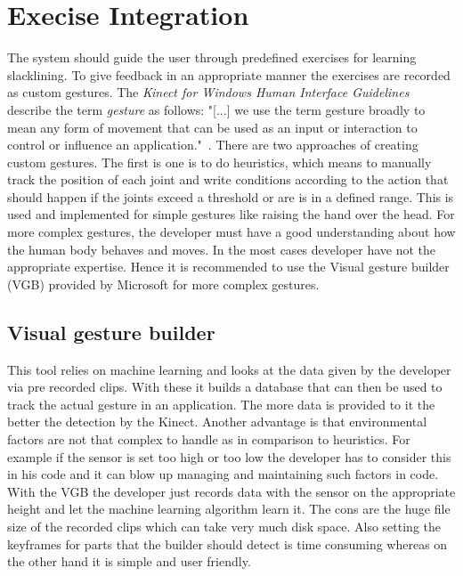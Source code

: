 \section{Execise Integration}\label{5_2_gestureConstruction}
The system should guide the user through predefined exercises for learning slacklining. To give feedback in an appropriate manner the exercises are recorded as custom gestures. The \textit{Kinect for Windows Human Interface Guidelines} describe the term \textit{gesture} as follows: "[...] we use the term gesture broadly to mean any form of movement that can be used as an input or interaction to control or influence an application."~\cite{MicrosoftHIG2014-mh}.
There are two approaches of creating custom gestures. The first is one is to do heuristics, which means to manually track the position of each joint and write conditions according to the action that should happen if the joints exceed a threshold or are is in a defined range. This is used and implemented for simple gestures like raising the hand over the head. For more complex gestures, the developer must have a good understanding about how the human body behaves and moves. In the most cases developer have not the appropriate expertise. Hence it is recommended to use the Visual gesture builder (VGB) provided by Microsoft for more complex gestures.

\subsection{Visual gesture builder}
This tool relies on machine learning and looks at the data given by the developer via pre recorded clips. With these it builds a database that can then be used to track the actual gesture in an application. The more data is provided to it the better the detection by the Kinect. Another advantage is that environmental factors are not that complex to handle as in comparison to heuristics. For example if the sensor is set too high or too low the developer has to consider this in his code and it can blow up managing and maintaining such factors in code. With the VGB the developer just records data with the sensor on the appropriate height and let the machine learning algorithm learn it. The cons are the huge file size of the recorded clips which can take very much disk space. Also setting the keyframes for parts that the builder should detect is time consuming whereas on the other hand it is simple and user friendly.

